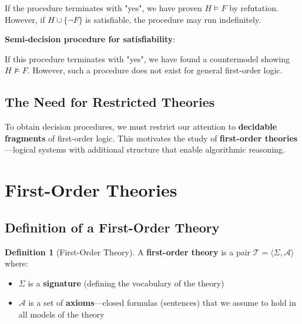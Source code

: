 \documentclass[11pt,a4paper]{article}
\theoremstyle{definition}
\newtheorem{definition}{Definition}[section]
\theoremstyle{plain}
\theoremstyle{remark}
\begin{document}
If the procedure terminates with "yes", we have proven $H \models F$ by refutation. However, if $H \cup \{\neg F\}$ is satisfiable, the procedure may run indefinitely.

\textbf{Semi-decision procedure for satisfiability}:
\begin{center}
\end{center}

If this procedure terminates with "yes", we have found a countermodel showing $H \not\models F$. However, such a procedure does not exist for general first-order logic.

\subsection{The Need for Restricted Theories}

To obtain decision procedures, we must restrict our attention to \textbf{decidable fragments} of first-order logic. This motivates the study of \textbf{first-order theories}---logical systems with additional structure that enable algorithmic reasoning.

\section{First-Order Theories}

\subsection{Definition of a First-Order Theory}

\begin{tcolorbox}[colback=purple!5!white,colframe=purple!75!black,title=\textbf{First-Order Theory}]
\begin{definition}[First-Order Theory]
A \textbf{first-order theory} is a pair $\mathcal{T} = \langle \Sigma, \mathcal{A} \rangle$ where:
\begin{itemize}
    \item $\Sigma$ is a \textbf{signature} (defining the vocabulary of the theory)
    \item $\mathcal{A}$ is a set of \textbf{axioms}---closed formulas (sentences) that we assume to hold in all models of the theory
\end{itemize}
\end{definition}
\end{tcolorbox}
\end{document}
